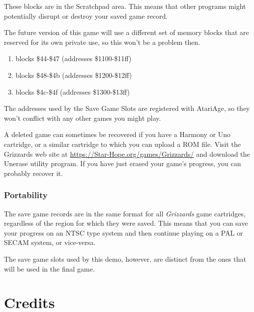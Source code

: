 \documentclass[10pt,twocolumn,openany,article]{memoir}
\begin{document}
\begin{description}
These blocks are in the Scratchpad  area. This means that other programs
might potentially disrupt or destroy your saved game record.

The  future version  of this  game will  use a  different set  of memory
blocks  that are  reserved for  its own  private use,  so this  won't be
a problem then.

\else

\begin{enumerate}
\item blocks \$44-\$47 (addresses \$1100-\$11ff)
\item blocks \$48-\$4b (addresses \$1200-\$12ff)
\item blocks \$4c-\$4f (addresses \$1300-\$13ff)
\end{enumerate}

The addresses used by the Save  Game Slots are registered with AtariAge,
so they won't conflict with any other games you might play.

A deleted game can  sometimes be recovered if you have  a Harmony or Uno
cartridge, or a similar cartridge to which you can upload a ROM file.
Visit the Grizzards web site at
\href{https://Star-Hope.org/games/Grizzards/}{https://Star-Hope\-.org/\-games/\-Grizzards/}
and  download the Unerase utility  program. If you have  just erased
your game's progress, you can probably recover it.

\fi


\subsection{Portability}

The save game records are in the same format for all \textit{Grizzards} game
cartridges, regardless of the region for which they were saved.  This means
that you can save your progress on an NTSC type system and then continue
playing on a PAL or SECAM system, or vice-versa.

\ifdefined\DEMO

The save  game slots used by  this demo, however, are  distinct from the
ones that will be used in the final game.

\fi

\fi %

\chapter{Credits}

{\small

}
\end{description}
\end{document}
